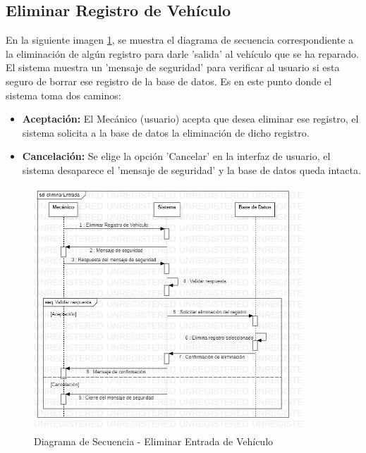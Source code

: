 \subsection{Eliminar Registro de Vehículo}
En la siguiente imagen \ref{fig:Diagrama de Secuencia - Eliminar Entrada de Vehículo}, se muestra el diagrama de secuencia correspondiente a la eliminación de algún registro para darle 'salida' al vehículo que se ha reparado. El sistema muestra un 'mensaje de seguridad' para verificar al usuario si esta seguro de borrar ese registro de la base de datos. Es en este punto donde el sistema toma dos caminos:
\begin{itemize}
	\item \textbf{Aceptación:} El Mecánico (usuario) acepta que desea eliminar ese registro, el sistema solicita a la base de datos la eliminación de dicho registro.
	\item \textbf{Cancelación:} Se elige la opción 'Cancelar' en la interfaz de usuario, el sistema desaparece el 'mensaje de seguridad' y la base de datos queda intacta. 
\end{itemize}
\begin{figure}[!h]
	\centering
	\includegraphics[width=0.9\textwidth]{./diseno/vprocesos/imagenes/eliminarEntrada}
	\caption{Diagrama de Secuencia - Eliminar Entrada de Vehículo}
	\label{fig:Diagrama de Secuencia - Eliminar Entrada de Vehículo}
\end{figure}
\clearpage